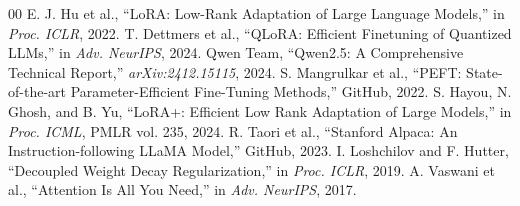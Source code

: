 \documentclass[conference]{IEEEtran}
\begin{document}
\begin{thebibliography}{00}
 E. J. Hu et al., ``LoRA: Low-Rank Adaptation of Large Language Models,'' in \textit{Proc. ICLR}, 2022.
 T. Dettmers et al., ``QLoRA: Efficient Finetuning of Quantized LLMs,'' in \textit{Adv. NeurIPS}, 2024.
 Qwen Team, ``Qwen2.5: A Comprehensive Technical Report,'' \textit{arXiv:2412.15115}, 2024.
 S. Mangrulkar et al., ``PEFT: State-of-the-art Parameter-Efficient Fine-Tuning Methods,'' GitHub, 2022.
 S. Hayou, N. Ghosh, and B. Yu, ``LoRA+: Efficient Low Rank Adaptation of Large Models,'' in \textit{Proc. ICML}, PMLR vol. 235, 2024.
 R. Taori et al., ``Stanford Alpaca: An Instruction-following LLaMA Model,'' GitHub, 2023.
 I. Loshchilov and F. Hutter, ``Decoupled Weight Decay Regularization,'' in \textit{Proc. ICLR}, 2019.
 A. Vaswani et al., ``Attention Is All You Need,'' in \textit{Adv. NeurIPS}, 2017.
\end{thebibliography}
\end{document}
